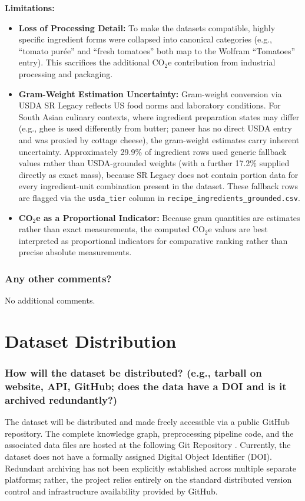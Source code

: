 \documentclass{article}
\newcommand{\question}[1]{#1}
\begin{document}
\textbf{Limitations:}
\begin{itemize}
    \item \textbf{Loss of Processing Detail:} To make the datasets compatible, highly specific ingredient forms were collapsed into canonical categories (e.g., ``tomato pur\'{e}e'' and ``fresh tomatoes'' both map to the Wolfram ``Tomatoes'' entry). This sacrifices the additional CO$_2$e contribution from industrial processing and packaging.
    \item \textbf{Gram-Weight Estimation Uncertainty:} Gram-weight conversion via USDA SR Legacy reflects US food norms and laboratory conditions. For South Asian culinary contexts, where ingredient preparation states may differ (e.g., ghee is used differently from butter; paneer has no direct USDA entry and was proxied by cottage cheese), the gram-weight estimates carry inherent uncertainty. Approximately 29.9\% of ingredient rows used generic fallback values rather than USDA-grounded weights (with a further 17.2\% supplied directly as exact mass), because SR Legacy does not contain portion data for every ingredient-unit combination present in the dataset. These fallback rows are flagged via the \texttt{usda\_tier} column in \texttt{recipe\_ingredients\_grounded.csv}.
    \item \textbf{CO$_2$e as a Proportional Indicator:} Because gram quantities are estimates rather than exact measurements, the computed CO$_2$e values are best interpreted as proportional indicators for comparative ranking rather than precise absolute measurements.
\end{itemize}

\question{\subsubsection*{Any other comments?}}

No additional comments.

\newpage




\section{Dataset Distribution}

\question{\subsubsection*{How will the dataset be distributed? (e.g., tarball on
website, API, GitHub; does the data have a DOI and is it
archived redundantly?)}}
The dataset will be distributed and made freely accessible via a public GitHub repository. The complete knowledge graph, preprocessing pipeline code, and the associated data files are hosted at the following Git Repository \href{https://github.com/DemirevMartin/knowledge-engineering}{}. Currently, the dataset does not have a formally assigned Digital Object Identifier (DOI). Redundant archiving has not been explicitly established across multiple separate platforms; rather, the project relies entirely on the standard distributed version control and infrastructure availability provided by GitHub.
\end{document}
